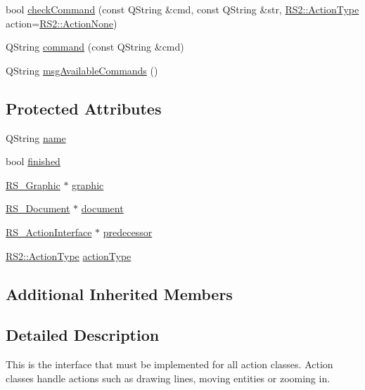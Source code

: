 \begin{DoxyCompactItemize}
\item 
bool \hyperlink{classRS__ActionInterface_ad8b1281d2f1af9adb83b6ec065c129ca}{check\-Command} (const Q\-String \&cmd, const Q\-String \&str, \hyperlink{classRS2_afe3523e0bc41fd637b892321cfc4b9d7}{R\-S2\-::\-Action\-Type} action=\hyperlink{classRS2_afe3523e0bc41fd637b892321cfc4b9d7a87399b91b144b6e5d53f649422fc00c6}{R\-S2\-::\-Action\-None})
\item 
Q\-String \hyperlink{classRS__ActionInterface_ac6f7d1bda87e67bab67c199eb471cb29}{command} (const Q\-String \&cmd)
\item 
Q\-String \hyperlink{classRS__ActionInterface_ad92868cbc8b8e69d90e4586e41c63961}{msg\-Available\-Commands} ()
\end{DoxyCompactItemize}
\subsection*{Protected Attributes}
\begin{DoxyCompactItemize}
\item 
Q\-String \hyperlink{classRS__ActionInterface_a1fdccfa2fcee3e1d21e6f79e6987f3df}{name}
\item 
bool \hyperlink{classRS__ActionInterface_aa6292f30c3efae59a21c3503346f0976}{finished}
\item 
\hyperlink{classRS__Graphic}{R\-S\-\_\-\-Graphic} $\ast$ \hyperlink{classRS__ActionInterface_a2853d0c3e15d00e2fd2c0358b5c0dd40}{graphic}
\item 
\hyperlink{classRS__Document}{R\-S\-\_\-\-Document} $\ast$ \hyperlink{classRS__ActionInterface_a686d15b5bd077529cd4d5e0707fb0773}{document}
\item 
\hyperlink{classRS__ActionInterface}{R\-S\-\_\-\-Action\-Interface} $\ast$ \hyperlink{classRS__ActionInterface_af078a781a6180c761956d93e4d2bd4cb}{predecessor}
\item 
\hyperlink{classRS2_afe3523e0bc41fd637b892321cfc4b9d7}{R\-S2\-::\-Action\-Type} \hyperlink{classRS__ActionInterface_ad040e10c710fc045051175336b50fda0}{action\-Type}
\end{DoxyCompactItemize}
\subsection*{Additional Inherited Members}


\subsection{Detailed Description}
This is the interface that must be implemented for all action classes. Action classes handle actions such as drawing lines, moving entities or zooming in.

